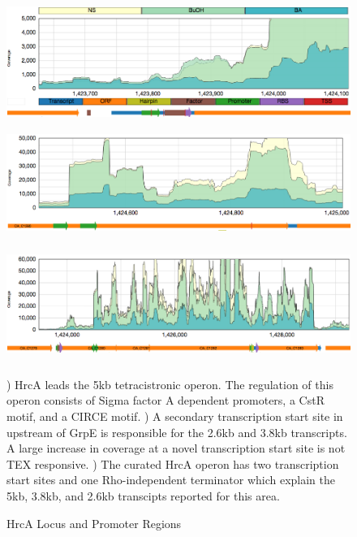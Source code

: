 \begin{figure}
{\includegraphics[width=\textwidth,height=1.5in]{images/Assembly/Examples/HrcA/HrcA-TSS.png}
\label{fig:8a}}
{\includegraphics[width=\textwidth,height=1.5in]{images/Assembly/Examples/HrcA/GrpE-TSS.png}
\label{fig:8b}}
{\includegraphics[width=\textwidth,height=1.5in]{images/Assembly/Examples/HrcA/HrcA-operon-curated.png}
\label{fig:8c}}
\caption{HrcA Locus and Promoter Regions}
) HrcA leads the 5kb tetracistronic operon. The regulation of this operon consists of Sigma factor A dependent promoters, a CstR motif, and a CIRCE motif. ) A secondary transcription start site in upstream of GrpE is responsible for the 2.6kb and 3.8kb transcripts. A large increase in coverage at a novel transcription start site is not TEX responsive. ) The curated HrcA operon has two transcription start sites and one Rho-independent terminator which explain the 5kb, 3.8kb, and 2.6kb transcipts reported for this area.
\end{figure}



